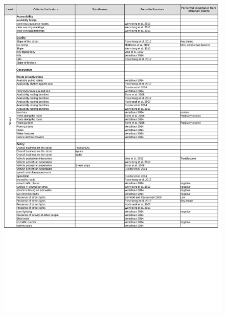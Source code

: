 \begin{appendix}
\begin{figure}[h]
\includegraphics[width=\textwidth]{img/annex/A3_street_criteria.pdf}
\end{figure}
\begin{figure}[h]

\end{figure}
\end{appendix}
